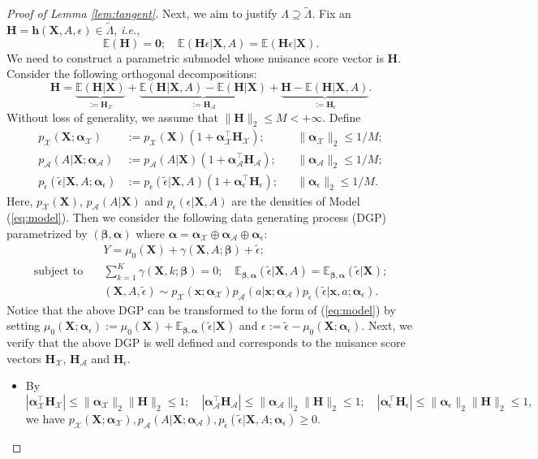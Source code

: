 \documentclass[11pt]{article}
\numberwithin{equation}{section}
\theoremstyle{definition}
\theoremstyle{remark}
\newcommand{\bh}{\bm{h}}
\newcommand{\bx}{\bm{x}}
\newcommand{\bH}{\bm{H}}
\newcommand{\bX}{\bm{X}}
\newcommand{\bbeta}{\bm{\beta}}
\newcommand{\balpha}{\bm{\alpha}}
\newcommand{\bbE}{\mathbb{E}}
\newcommand{\sA}{\mathscr{A}}
\newcommand{\sX}{\mathscr{X}}
\newcommand{\bzero}{\mathbf{0}}	%
\begin{document}
\begin{proof}[Proof of Lemma \ref{lem:tangent}]
	Next, we aim to justify $ \Lambda \supseteq \widetilde{\Lambda} $. Fix an $ \bH = \bh(\bX,A,\epsilon) \in \widetilde{\Lambda} $, \textit{i.e.},
	\[ \bbE(\bH) = \bzero; \quad \bbE(\bH\epsilon|\bX,A) = \bbE(\bH\epsilon|\bX). \]
	We need to construct a parametric submodel whose nuisance score vector is $ \bH $. Consider the following orthogonal decompositions:
	\[ \bH = \underbrace{\bbE(\bH|\bX)}_{:= \bH_{\sX}} + \underbrace{\bbE(\bH|\bX,A) - \bbE(\bH|\bX)}_{:= \bH_{\sA}} + \underbrace{\bH - \bbE(\bH|\bX,A)}_{:=\bH_{\epsilon}}. \]
	Without loss of generality, we assume that $ \| \bH \|_{2} \le M < +\infty $. Define
	\begin{align*}
		p_{\sX}(\bX;\balpha_{\sX}) &:= p_{\sX}(\bX)(1 + \balpha_{\sX}^{\intercal}\bH_{\sX}); && \| \balpha_{\sX} \|_{2} \le 1/M;\\
		p_{\sA}(A|\bX;\balpha_{\sA}) &:= p_{\sA}(A|\bX)(1 + \balpha_{\sA}^{\intercal}\bH_{\sA}); && \| \balpha_{\sA} \|_{2} \le 1/M;\\
		p_{\widetilde{\epsilon}}(\widetilde{\epsilon}|\bX,A;\balpha_{\epsilon}) &:= p_{\epsilon}(\widetilde{\epsilon}|\bX,A)(1 + \balpha_{\epsilon}^{\intercal}\bH_{\epsilon}); && \| \balpha_{\epsilon} \|_{2} \le 1/M.
	\end{align*}
	Here, $ p_{\sX}(\bX) $, $ p_{\sA}(A|\bX) $ and $ p_{\epsilon}(\epsilon|\bX,A) $ are the densities of Model (\ref{eq:model}). Then we consider the following data generating process (DGP) parametrized by $ (\bbeta,\balpha) $ where $ \balpha = \balpha_{\sX} \oplus \balpha_{\sA} \oplus \balpha_{\epsilon} $:
	\begin{align*}
		&Y = \mu_{0}(\bX) + \gamma(\bX,A;\bbeta) + \widetilde{\epsilon};\\
		\text{subject to} \quad &\sum_{k=1}^{K}\gamma(\bX,k;\bbeta) = 0; \quad \bbE_{\bbeta,\balpha}(\widetilde{\epsilon}|\bX,A) = \bbE_{\bbeta,\balpha}(\widetilde{\epsilon}|\bX);\\
		&(\bX,A,\widetilde{\epsilon}) \sim p_{\sX}(\bx;\balpha_{\sX})p_{\sA}(a|\bx;\balpha_{\sA})p_{\widetilde{\epsilon}}(\widetilde{\epsilon}|\bx,a;\balpha_{\epsilon}).
	\end{align*}
	Notice that the above DGP can be transformed to the form of (\ref{eq:model}) by setting $ \mu_{0}(\bX;\balpha_{\epsilon}) := \mu_{0}(\bX) + \bbE_{\bbeta,\balpha}(\widetilde{\epsilon}|\bX) $ and $ \epsilon := \widetilde{\epsilon} - \mu_{0}(\bX;\balpha_{\epsilon}) $. Next, we verify that the above DGP is well defined and corresponds to the nuisance score vectors $ \bH_{\sX} $, $ \bH_{\sA} $ and $ \bH_{\epsilon} $.
	\begin{itemize}
		\item By 
		\[ |\balpha^{\intercal}_{\sX}\bH_{\sX}| \le \|\balpha_{\sX}\|_{2}\|\bH\|_{2} \le 1;\quad |\balpha^{\intercal}_{\sA}\bH_{\sA}| \le \|\balpha_{\sA}\|_{2}\|\bH\|_{2} \le 1;\quad|\balpha^{\intercal}_{\epsilon}\bH_{\epsilon}| \le \|\balpha_{\epsilon}\|_{2}\|\bH\|_{2} \le 1, \]
		we have $ p_{\sX}(\bX;\balpha_{\sX}),p_{\sA}(A|\bX;\balpha_{\sA}),p_{\widetilde{\epsilon}}(\widetilde{\epsilon}|\bX,A;\balpha_{\epsilon}) \ge 0 $.
		

\end{itemize}
\end{proof}
\end{document}
